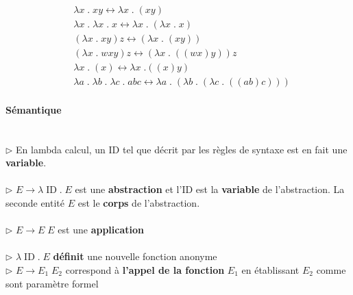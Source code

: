 \documentclass{report}
\begin{document}
\begin{multicols*}{3}
    \begin{align*}
        & \lambda x \;. \; x y \leftrightarrow \lambda x \; . \; (x y) \\
        & \lambda x \;. \; \lambda x \;. \;x 
        \leftrightarrow \lambda x \; . \; (\lambda x \; . \; x) \\ 
        & (\lambda x \; . \; x y) z \leftrightarrow 
        (\lambda x \; . \; (x y)) \\ 
        & (\lambda x \; . \; w x y) z  \leftrightarrow 
        (\lambda x \; . \; ((w x) y)) z \\ 
        & \lambda x \; . \; (x) \leftrightarrow \lambda x \; . ((x) y) \\ 
        & \lambda a \; . \; \lambda b \; . \; \lambda c \; . \; 
        a b c \leftrightarrow 
        \lambda a \; . \; (\lambda b \; . \; (\lambda c \; . \; ((a b) c)) )
    \end{align*}


    \paragraph{Sémantique} \mbox{}\\
    $\rhd$ En lambda calcul, un ID tel que décrit par les règles de 
    syntaxe est en fait une \textbf{variable}.   
    \mbox{} \\\\ 
    $\rhd$ $ E \rightarrow \lambda \; \text{ID} \; . \; E$ est une 
    \textbf{abstraction} et l'ID est la \textbf{variable} 
    de l'abstraction. La seconde entité $E$ est le \textbf{corps} de 
    l'abstraction.     
    \mbox{}\\\\
    $\rhd$ $ E \rightarrow E \; E$ est une \textbf{application}  
    \mbox{} \\\\  
    $\rhd$ $ \lambda \; \text{ID} \; . \; E$ \textbf{définit} une nouvelle 
    fonction anonyme
    \mbox{} \\ 
    $\rhd$ $E \rightarrow E_1 \; E_2$ correspond à \textbf{l'appel de la 
    fonction} $E_1$ en établissant $E_2$ comme sont paramètre formel 


\end{multicols*}
\end{document}
